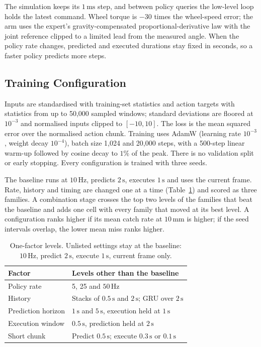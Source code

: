\documentclass[conference]{IEEEtran}
\begin{document}
The simulation keeps its $1\,\mathrm{ms}$ step, and between policy queries the low-level loop holds the latest command. Wheel torque is $-30$ times the wheel-speed error; the arm uses the expert's gravity-compensated proportional-derivative law with the joint reference clipped to a limited lead from the measured angle. When the policy rate changes, predicted and executed durations stay fixed in seconds, so a faster policy predicts more steps.

\subsection{Training Configuration}
Inputs are standardised with training-set statistics and action targets with statistics from up to 50,000 sampled windows; standard deviations are floored at $10^{-3}$ and normalised inputs clipped to $[-10,10]$. The loss is the mean squared error over the normalised action chunk. Training uses AdamW (learning rate $10^{-3}$, weight decay $10^{-4}$), batch size 1,024 and 20,000 steps, with a 500-step linear warm-up followed by cosine decay to $1\%$ of the peak. There is no validation split or early stopping. Every configuration is trained with three seeds.

The baseline runs at $10\,\mathrm{Hz}$, predicts $2\,\mathrm{s}$, executes $1\,\mathrm{s}$ and uses the current frame. Rate, history and timing are changed one at a time (Table~\ref{tab:factors}) and scored as three families. A combination stage crosses the top two levels of the families that beat the baseline and adds one cell with every family that moved at its best level. A configuration ranks higher if its mean catch rate at $10\,\mathrm{mm}$ is higher; if the seed intervals overlap, the lower mean miss ranks higher.

\begin{table}[t]
\centering
\caption{One-factor levels. Unlisted settings stay at the baseline: $10\,\mathrm{Hz}$, predict $2\,\mathrm{s}$, execute $1\,\mathrm{s}$, current frame only.}
\label{tab:factors}
\footnotesize
\begin{tabular}{lp{5.2cm}}
\toprule
Factor & Levels other than the baseline \\
\midrule
Policy rate & 5, 25 and $50\,\mathrm{Hz}$ \\
History & Stacks of $0.5\,\mathrm{s}$ and $2\,\mathrm{s}$; GRU over $2\,\mathrm{s}$ \\
Prediction horizon & $1\,\mathrm{s}$ and $5\,\mathrm{s}$, execution held at $1\,\mathrm{s}$ \\
Execution window & $0.5\,\mathrm{s}$, prediction held at $2\,\mathrm{s}$ \\
Short chunk & Predict $0.5\,\mathrm{s}$; execute $0.3\,\mathrm{s}$ or $0.1\,\mathrm{s}$ \\
\bottomrule
\end{tabular}
\end{table}
\end{document}
